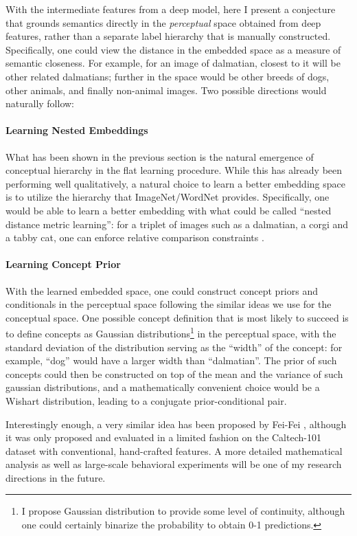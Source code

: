 With the intermediate features from a deep model, here I present a conjecture that grounds semantics directly in the \emph{perceptual} space obtained from deep features, rather than a separate label hierarchy that is manually constructed. Specifically, one could view the distance in the embedded space as a measure of semantic closeness. For example, for an image of dalmatian, closest to it will be other related dalmatians; further in the space would be other breeds of dogs, other animals, and finally non-animal images. Two possible directions would naturally follow:

\paragraph{Learning Nested Embeddings} What has been shown in the previous section is the natural emergence of conceptual hierarchy in the flat learning procedure. While this has already been performing well qualitatively, a natural choice to learn a better embedding space is to utilize the hierarchy that ImageNet/WordNet provides. Specifically, one would be able to learn a better embedding with what could be called ``nested distance metric learning'': for a triplet of images such as a dalmatian, a corgi and a tabby cat, one can enforce relative comparison constraints \cite{schultz2003learning}.

\paragraph{Learning Concept Prior} With the learned embedded space, one could construct concept priors and conditionals in the perceptual space following the similar ideas we use for the conceptual space. One possible concept definition that is most likely to succeed is to define concepts as Gaussian distributions\footnote{I propose Gaussian distribution to provide some level of continuity, although one could certainly binarize the probability to obtain 0-1 predictions.} in the perceptual space, with the standard deviation of the distribution serving as the ``width'' of the concept: for example, ``dog'' would have a larger width than ``dalmatian''. The prior of such concepts could then be constructed on top of the mean and the variance of such gaussian distributions, and a mathematically convenient choice would be a Wishart distribution, leading to a conjugate prior-conditional pair.

Interestingly enough, a very similar idea has been proposed by Fei-Fei \etal \cite{fei2006one}, although it was only proposed and evaluated in a limited fashion on the Caltech-101 dataset with conventional, hand-crafted features. A more detailed mathematical analysis as well as large-scale behavioral experiments will be one of my research directions in the future.

